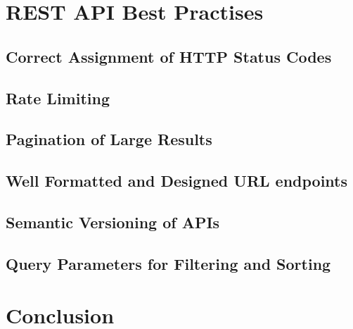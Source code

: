 \section{REST API Best Practises}
\subsection{Correct Assignment of HTTP Status Codes}
\subsection{Rate Limiting}
\subsection{Pagination of Large Results}
\subsection{Well Formatted and Designed URL endpoints}
\subsection{Semantic Versioning of APIs}
\subsection{Query Parameters for Filtering and Sorting}

\section{Conclusion}